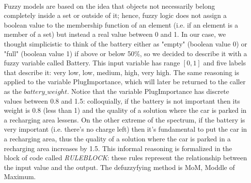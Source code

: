 \paragraph{} Fuzzy models are based on the idea that objects not necessarily belong completely inside a set or outside of it; hence, fuzzy logic does not assign a boolean value to the membership function of an element (i.e. if an element is a member of a set) but instead a real value between 0 and 1. In our case, we thought simplicistic to think of the battery either as "empty" (boolean value 0) or "full" (boolean value 1) if above or below 50\%, so we decided to describe it with a fuzzy variable called Battery. This input variable has range $[0, 1]$ and five labels that describe it: very low, low, medium, high, very high. The same reasoning is applied to the variable PlugImportance, which will later be returned to the caller as the $battery\_weight$. Notice that the variable PlugImportance has discrete values between 0.8 and 1.5: colloquially, if the battery is not important then its weight is 0.8 (less than 1) and the quality of a solution where the car is parked in a recharging area lessens. On the other extreme of the spectrum, if the battery is very important (i.e. there's no charge left) then it's fundamental to put the car in a recharging area, thus the quality of a solution where the car is parked in a recharging area increases by 1.5.
This informal reasoning is formalized in the block of code called \textit{RULEBLOCK}: these rules represent the relationship between the input value and the output. 
The defuzzyfying method is MoM, Moddle of Maximum.
